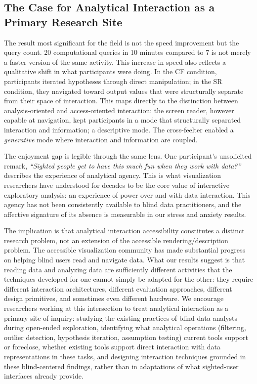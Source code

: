 \documentclass[12pt]{cmuthesis}
\begin{document}
\subsection{The Case for Analytical Interaction as a Primary Research Site}
\label{sec:imperative-1}

The result most significant for the field is not the speed improvement but the query count. 20 computational queries in 10 minutes compared to 7 is not merely a faster version of the same activity. This increase in speed also reflects a qualitative shift in what participants were doing. In the CF condition, participants iterated hypotheses through direct manipulation; in the SR condition, they navigated toward output values that were structurally separate from their space of interaction. This maps directly to the distinction between analysis-oriented and access-oriented interaction: the screen reader, however capable at navigation, kept participants in a mode that structurally separated interaction and information; a descriptive mode. The cross-feelter enabled a \textit{generative} mode where interaction and information are coupled.

The enjoyment gap is legible through the same lens. One participant's unsolicited remark, \textit{``Sighted people get to have this much fun when they work with data?''} describes the experience of analytical agency. This is what visualization researchers have understood for decades to be the core value of interactive exploratory analysis: an experience of power over and with data interaction. This agency has not been consistently available to blind data practitioners, and the affective signature of its absence is measurable in our stress and anxiety results.

The implication is that analytical interaction accessibility constitutes a distinct research problem, not an extension of the accessible rendering/description problem. The accessible visualization community has made substantial progress on helping blind users read and navigate data. What our results suggest is that reading data and analyzing data are sufficiently different activities that the techniques developed for one cannot simply be adapted for the other: they require different interaction architectures, different evaluation approaches, different design primitives, and sometimes even different hardware. We encourage researchers working at this intersection to treat analytical interaction as a primary site of inquiry: studying the existing practices of blind data analysts during open-ended exploration, identifying what analytical operations (filtering, outlier detection, hypothesis iteration, assumption testing) current tools support or foreclose, whether existing tools support direct interaction with data representations in these tasks, and designing interaction techniques grounded in these blind-centered findings, rather than in adaptations of what sighted-user interfaces already provide.
\end{document}
